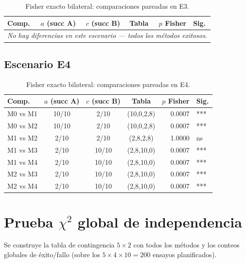 \documentclass[12pt,a4paper,oneside]{book}
\begin{document}
\begin{table}[H]
\centering
\caption{Fisher exacto bilateral: comparaciones pareadas en E3.}
\begin{tabular}{lcccrl}
\toprule
\textbf{Comp.} & \textbf{$a$ (succ A)} & \textbf{$c$ (succ B)} & \textbf{Tabla} & \textbf{$p$ Fisher} & \textbf{Sig.} \\
\midrule
\multicolumn{6}{c}{\textit{No hay diferencias en este escenario --- todos los métodos exitosos.}} \\
\bottomrule
\end{tabular}
\end{table}

\subsection{Escenario E4}

\begin{table}[H]
\centering
\caption{Fisher exacto bilateral: comparaciones pareadas en E4.}
\begin{tabular}{lcccrl}
\toprule
\textbf{Comp.} & \textbf{$a$ (succ A)} & \textbf{$c$ (succ B)} & \textbf{Tabla} & \textbf{$p$ Fisher} & \textbf{Sig.} \\
\midrule
M0 vs M1 & 10/10 & 2/10 & (10,0,2,8) & 0.0007 & *** \\
M0 vs M2 & 10/10 & 2/10 & (10,0,2,8) & 0.0007 & *** \\
M1 vs M2 & 2/10 & 2/10 & (2,8,2,8) & 1.0000 & ns \\
M1 vs M3 & 2/10 & 10/10 & (2,8,10,0) & 0.0007 & *** \\
M1 vs M4 & 2/10 & 10/10 & (2,8,10,0) & 0.0007 & *** \\
M2 vs M3 & 2/10 & 10/10 & (2,8,10,0) & 0.0007 & *** \\
M2 vs M4 & 2/10 & 10/10 & (2,8,10,0) & 0.0007 & *** \\
\bottomrule
\end{tabular}
\end{table}

\newpage
\section{Prueba $\chi^2$ global de independencia}

Se construye la tabla de contingencia $5 \times 2$ con todos los métodos y los conteos globales de éxito/fallo (sobre los $5 \times 4 \times 10 = 200$ ensayos planificados).
\end{document}
